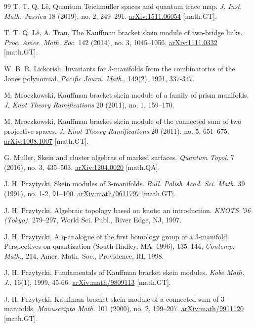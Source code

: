 \documentclass[12pt]{amsproc}
\begin{document}
\begin{thebibliography}{99}
T. T. Q. Lê,
Quantum Teichmüller spaces and quantum trace map.
{\it J. Inst. Math. Jussieu} 18 (2019), no. 2, 249–291. \href{https://arxiv.org/abs/1511.06054}{arXiv:1511.06054} [math.GT].

T. T. Q. L\^e, A. Tran,
The Kauffman bracket skein module of two-bridge links. 
{\it Proc. Amer. Math. Soc.} 142 (2014), no. 3, 1045–1056. \href{https://arxiv.org/abs/1111.0332} {arXiv:1111.0332} [math.GT].

	 W. B. R. Lickorish, Invariants for 3-manifolds from
	 the combinatorics of the Jones polynomial. {\it Pacific Journ. Math.}, 149(2), 1991, 337-347.

M. Mroczkowski, Kauffman bracket skein module of a family of prism manifolds.
{\it J. Knot Theory Ramifications} 20 (2011), no. 1, 159–170.

M. Mroczkowski, Kauffman bracket skein module of the connected sum of two projective spaces. 
{\it J. Knot Theory Ramifications} 20 (2011), no. 5, 651–675. \href{https://arxiv.org/abs/1008.1007} {arXiv:1008.1007} [math.GT].

G. Muller,
Skein and cluster algebras of marked surfaces.
{\it Quantum Topol.} 7 (2016), no. 3, 435–503. \href{https://arxiv.org/abs/1204.0020}{arXiv:1204.0020} [math.QA].

J. H. Przytycki, Skein modules of 3-manifolds. {\it Bull. Polish Acad. Sci. Math.} 39 (1991), no. 1-2, 91–100. \href{https://arxiv.org/abs/math/0611797}{arXiv:math/0611797} [math.GT].

J. H. Przytycki, Algebraic topology based on knots: an introduction. {\it KNOTS '96 (Tokyo).} 279–297, World Sci. Publ., River Edge, NJ, 1997.

J. H. Przytycki,
A q-analogue of the first homology group of a $3$-manifold. Perspectives on quantization (South Hadley, MA, 1996), 135–144, 
{\it Contemp. Math.}, 214, Amer. Math. Soc., Providence, RI, 1998.

J. H. Przytycki, Fundamentals of Kauffman bracket skein modules. {\it Kobe Math. J.}, 16(1), 1999, 45-66. \href{https://arxiv.org/abs/math/9809113}{arXiv:math/9809113} [math.GT]. 

J. H. Przytycki,
Kauffman bracket skein module of a connected sum of $3$-manifolds.  
{\it Manuscripta Math.} 101 (2000), no. 2, 199–207. \href{https://arxiv.org/abs/math/9911120}{arXiv:math/9911120} [math.GT].


\end{thebibliography}
\end{document}
